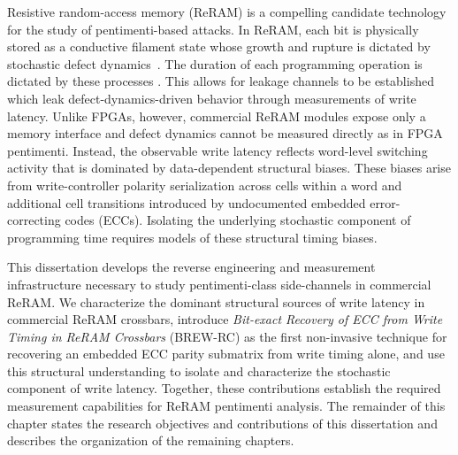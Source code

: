 Resistive random-access memory (ReRAM) is a compelling candidate
technology for the study of pentimenti-based attacks. In ReRAM, each bit
is physically stored as a conductive filament state whose growth and
rupture is dictated by stochastic defect dynamics~\cite{waser2009redox,
	ambrogio2013understanding, Ielmini_2016}. The duration of each
programming operation is dictated by these processes
\cite{jo2009programmable, witzleben2017investigation}. This allows for
leakage channels to be established which leak defect-dynamics-driven
behavior through measurements of write latency. Unlike FPGAs, however,
commercial ReRAM modules expose only a memory interface and defect
dynamics cannot be measured directly as in FPGA pentimenti. Instead, the
observable write latency reflects word-level switching activity that is
dominated by data-dependent structural biases. These biases arise from
write-controller polarity serialization across cells within a word and
additional cell transitions introduced by undocumented embedded
error-correcting codes (ECCs). Isolating the underlying stochastic
component of programming time requires models of these structural timing
biases.

This dissertation develops the reverse engineering and measurement
infrastructure necessary to study pentimenti-class side-channels in
commercial ReRAM. We characterize the dominant structural sources of
write latency in commercial ReRAM crossbars, introduce \emph{Bit-exact
	Recovery of ECC from Write Timing in ReRAM Crossbars} (BREW-RC) as the
first non-invasive technique for recovering an embedded ECC parity
submatrix from write timing alone, and use this structural understanding
to isolate and characterize the stochastic component of write latency.
Together, these contributions establish the required measurement
capabilities for ReRAM pentimenti analysis. The remainder of this
chapter states the research objectives and contributions of this
dissertation and describes the organization of the remaining chapters.